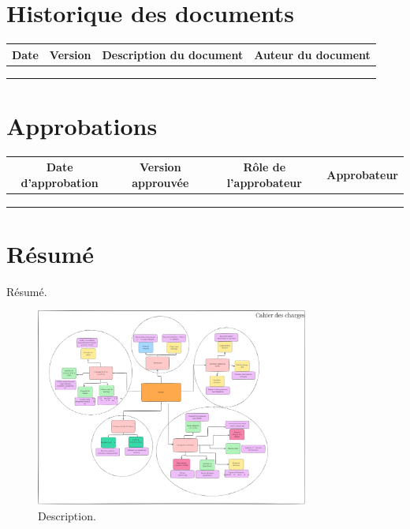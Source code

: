 \documentclass[a4paper,12pt]{report}  %
\begin{document}
	\section*{Historique des documents}
	\begin{table}[h]
		\begin{tabular}{|c|c|c|c|} 
			\hline
			\textbf{Date} & \textbf{Version} & \textbf{Description du document} & \textbf{Auteur du document} \\
			\hline
			& & & \\
			\hline
			& & & \\
			\hline
			& & & \\
			\hline
		\end{tabular}
	\end{table}
	
	\section*{Approbations}
	\begin{table}[h]
		\begin{tabular}{|c|c|c|c|} 
			\hline
			\textbf{Date d'approbation} & \textbf{Version approuvée} & \textbf{Rôle de l'approbateur} & \textbf{Approbateur} \\
			\hline
			& & & \\
			\hline
			& & & \\
			\hline
			& & & \\
			\hline
		\end{tabular}
	\end{table}
	
		
	\tableofcontents
	
	\pagebreak
	
	\section{Résumé}
	
	Résumé. 
	
	\begin{figure}[h]
		\centering
		\includegraphics[width=0.8\textwidth]{./attachements/Untitled-2025-06-11-1251_B.pdf}
		\caption{Description. }
		\label{fig:your_label}
	\end{figure}
	
\end{document}
